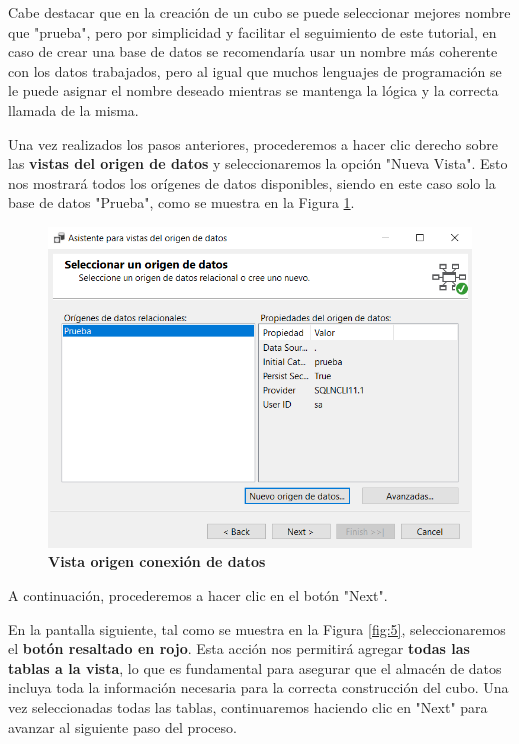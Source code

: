 \documentclass[12pt, a4paper, twoside]{article}
\begin{document}
Cabe destacar que en la creación de un cubo se puede seleccionar mejores nombre que "prueba", pero por simplicidad y facilitar el seguimiento de este tutorial, en caso de crear una base de datos se recomendaría usar un nombre más coherente con los datos trabajados, pero al igual que muchos lenguajes de programación se le puede asignar el nombre deseado mientras se mantenga la lógica y la correcta llamada de la misma.

Una vez realizados los pasos anteriores, procederemos a hacer clic derecho sobre las \textbf{vistas del origen de datos} y seleccionaremos la opción "Nueva Vista". Esto nos mostrará todos los orígenes de datos disponibles, siendo en este caso solo la base de datos "Prueba", como se muestra en la Figura \ref{fig:4}.

\begin{figure}[H]
	\centering
	\includegraphics[width=1\textwidth]{image/vistaOrigenConexion}
	\caption{\textbf{Vista origen conexión de datos}}
	\label{fig:4}
\end{figure}

A continuación, procederemos a hacer clic en el botón "Next".

En la pantalla siguiente, tal como se muestra en la Figura \ref{fig:5}, seleccionaremos el \textbf{botón resaltado en rojo}. Esta acción nos permitirá agregar \textbf{todas las tablas a la vista}, lo que es fundamental para asegurar que el almacén de datos incluya toda la información necesaria para la correcta construcción del cubo. Una vez seleccionadas todas las tablas, continuaremos haciendo clic en "Next" para avanzar al siguiente paso del proceso.
\end{document}
